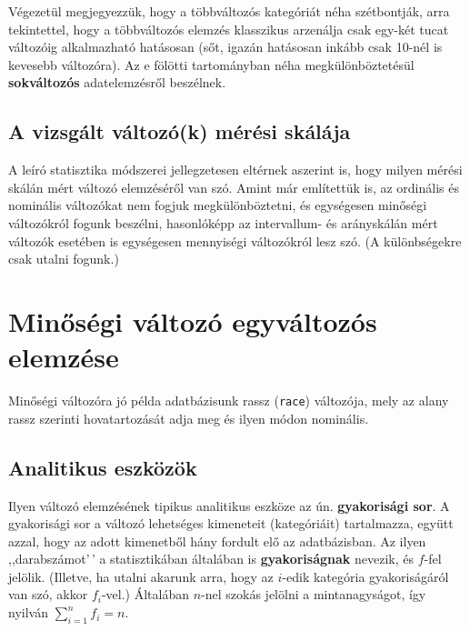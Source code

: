 \documentclass[
]{book}
\begin{document}
Végezetül megjegyezzük, hogy a többváltozós kategóriát néha szétbontják, arra tekintettel, hogy a többváltozós elemzés klasszikus arzenálja csak egy-két tucat változóig alkalmazható hatásosan (sőt, igazán hatásosan inkább csak 10-nél is kevesebb változóra). Az e fölötti tartományban néha megkülönböztetésül \textbf{sokváltozós} adatelemzésről beszélnek.

\hypertarget{deskriptivcsoportositasmeresiskala}{%
\subsection{A vizsgált változó(k) mérési skálája}\label{deskriptivcsoportositasmeresiskala}}

A leíró statisztika módszerei jellegzetesen eltérnek aszerint is, hogy milyen mérési skálán mért változó elemzéséről van szó. Amint már említettük is, az ordinális és nominális változókat nem fogjuk megkülönböztetni, és egységesen minőségi változókról fogunk beszélni, hasonlóképp az intervallum- és arányskálán mért változók esetében is egységesen mennyiségi változókról lesz szó. (A különbségekre csak utalni fogunk.)

\hypertarget{deskriptivminegyvalt}{%
\section{Minőségi változó egyváltozós elemzése}\label{deskriptivminegyvalt}}

Minőségi változóra jó példa adatbázisunk rassz (\texttt{race}) változója, mely az alany rassz szerinti hovatartozását adja meg és ilyen módon nominális.

\hypertarget{deskriptivmonegyvaltanalitikus}{%
\subsection{Analitikus eszközök}\label{deskriptivmonegyvaltanalitikus}}

Ilyen változó elemzésének tipikus analitikus eszköze az ún. \textbf{gyakorisági sor}. A gyakorisági sor a változó lehetséges kimeneteit (kategóriáit) tartalmazza, együtt azzal, hogy az adott kimenetből hány fordult elő az adatbázisban. Az ilyen ,,darabszámot'\,' a statisztikában általában is \textbf{gyakoriságnak} nevezik, és \(f\)-fel jelölik. (Illetve, ha utalni akarunk arra, hogy az \(i\)-edik kategória gyakoriságáról van szó, akkor \(f_i\)-vel.) Általában \(n\)-nel szokás jelölni a mintanagyságot, így nyilván \(\sum_{i=1}^n f_i = n\).
\end{document}
